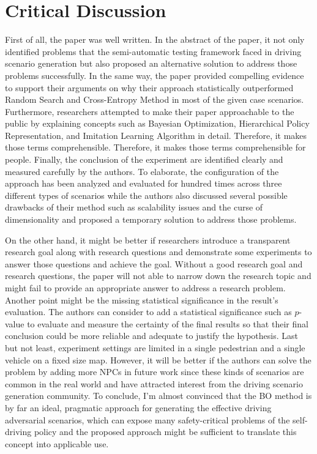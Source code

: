 \documentclass[10pt,a4paper]{report}
\begin{document}
\section{Critical Discussion}
First of all, the paper was well written. In the abstract of the paper, it not only identified problems that the semi-automatic testing framework faced in driving scenario generation but also proposed an alternative solution to address those problems successfully. 
%
In the same way, the paper provided compelling evidence to support their arguments on why their approach statistically outperformed Random Search and Cross-Entropy Method in most of the given case scenarios.
%
Furthermore, researchers attempted to make their paper approachable to the public by explaining concepts such as Bayesian Optimization, Hierarchical Policy Representation, and Imitation Learning Algorithm in detail. Therefore, it makes those terms comprehensible.
%
Therefore, it makes those terms comprehensible for people.  
%
Finally, the conclusion of the experiment are identified clearly and measured carefully by the authors. 
%
To elaborate, the configuration of the approach has been analyzed and evaluated for hundred times across three different types of scenarios while the authors also discussed several possible drawbacks of their method such as scalability issues and the curse of dimensionality and proposed a temporary solution to address those problems.
%

On the other hand, it might be better if researchers introduce a transparent research goal along with research questions and demonstrate some experiments to answer those questions and achieve the goal. 
%
Without a good research goal and research questions, the paper will not able to narrow down the research topic and might fail to provide an appropriate answer to address a research problem.
%
Another point might be the missing statistical significance in the result's evaluation.
%
The authors can consider to add a statistical significance such as $p$-value to evaluate and measure the certainty of the final results so that their final conclusion could be more reliable and adequate to justify the hypothesis.
%
Last but not least, experiment settings are limited in a single pedestrian and a single vehicle on a fixed size map. 
%
However, it will be better if the authors can solve the problem by adding more NPCs in future work since these kinds of scenarios are common in the real world and have attracted interest from the driving scenario generation community.
%
To conclude, I’m almost convinced that the BO method is by far an ideal, pragmatic approach for generating the effective driving adversarial scenarios, which can expose many safety-critical problems of the self-driving policy and the proposed approach might be sufficient to translate this concept into applicable use.
\end{document}
